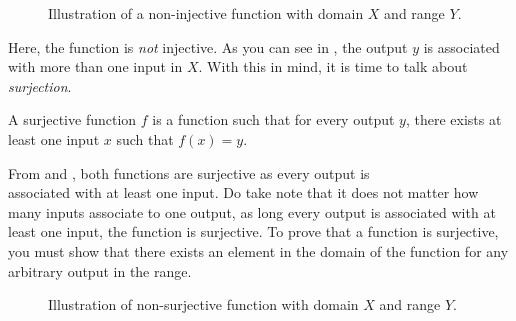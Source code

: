 \begin{figure}[h]
\centering
{} 
\caption{Illustration of a non-injective function with domain \(X\) and range \(Y\).}
\label{non_inj}
\end{figure}


Here, the function is \textit{not} injective. As you can see in , the output \(y\) is associated with more than one input in \(X\). With this in mind, it is time to talk about \textit{surjection}. 
\begin{definition}
  A surjective function \(f\) is a function such that for every output \(y\), there exists at least one input \(x\) such that \(f(x)=y\). 
\end{definition}


From  and , both functions are surjective as every output is \\ associated with at least one input. Do take note that it does not matter how many inputs associate to one output, as long every output is associated with at least one input, the function is surjective. To prove that a function is surjective, you must show that there exists an element in the domain of the function for any arbitrary output in the range.

\begin{figure}[h]
\centering
{} 
\caption{Illustration of non-surjective function with domain \(X\) and range \(Y\).}
\label{nsurj}
\end{figure}


